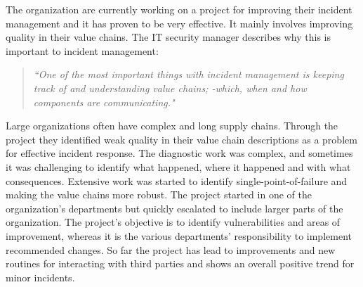 The organization are currently working on a project for improving their incident management and it has proven to be very effective. It mainly involves improving quality in their value chains. The IT security manager describes why this is important to incident management:
\begin{quote}
\textit{``One of the most important things with incident management is keeping track of and understanding value chains; -which, when and how components are communicating."}
\end{quote}
Large organizations often have complex and long supply chains. Through the project they identified weak quality in their value chain descriptions as a problem for effective incident response. The diagnostic work was complex, and sometimes it was challenging to identify what happened, where it happened and with what consequences. Extensive work was started to identify single-point-of-failure and making the value chains more robust. The project started in one of the organization's departments but quickly escalated to include larger parts of the organization. The project's objective is to identify vulnerabilities and areas of improvement, whereas it is the various departments' responsibility to implement recommended changes. So far the project has lead to improvements and new routines for interacting with third parties and shows an overall positive trend for minor incidents. 